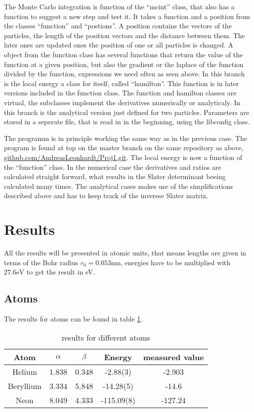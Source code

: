 \documentclass[a4paper,10pt]{article}
\begin{document}
The Monte Carlo integration is function of the ``mcint'' class, that also has a function to suggest a new step 
and test it. It takes a function and a position from the classes ``function'' and ``postions''. A position contains the vectors of the particles, 
the length of the position vectors and
the distance between them. The later ones are updated ones the position of one or all particles is changed. 
A object from the function class has several functions that return the value of the function at a given position, 
but also the gradient or the laplace of the function divided by the function, expressions we need often as seen above. 
In this branch is the local energy a class for itself, called ``hamilton''. This function is in later versions included in the function class.
The function and hamilton classes are virtual, the subclasses implement the derivatives numerically or analyticaly. 
In this branch is the analytical version just defined for two particles. 
Parameters are stored in a seperate file, that is read in in the beginning, using the libconfig class.

The programm is in principle working the same way as in the previous case. The program is found at top on the master branch on the same repository as above,
\href{https://github.com/AndreasLeonhardt/Proj1.git}{github.com/AndreasLeonhardt/Proj1.git}.
The local energy is now a function of the ``function'' class. 
In the numerical case the derivatives and ratios are calculated straight forward, what results in the Slater determinant beeing calculated many times.
The analytical cases makes use of the simplifications described above and has to keep track of the inverese Slater matrix. 


\section{Results}
All the results will be presented in atomic units, that means lengths are given in terms of the Bohr radius $r_0 = 0.053\text{nm}$, energies have to be multiplied with $27.6\text{eV}$ 
to get the result in eV. 

\subsection{Atoms}

The results for atoms can be found in table \ref{atomtable}.
\begin{table}[htbp]
 \center
 \begin{tabular}{|c|c|c|c|c|}
 \hline
 \textbf{Atom} & \textbf{$\alpha$} & \textbf{$\beta$} & \textbf{Energy} & \textbf{measured value} \\
 \hline
 Helium &1.838 & 0.348&-2.88(3) & -2.903 \cite{Moskowitz}\\
 Beryllium &3.334 &5.848 &-14.28(5) & -14.6 \cite{webel}\\
 Neon & 8.049& 4.333& -115.09(8)& -127.24 \cite{webel}\\ 
 \hline 
 \end{tabular}
\label{atomtable}
\caption{results for different atoms}
\end{table}
\end{document}
